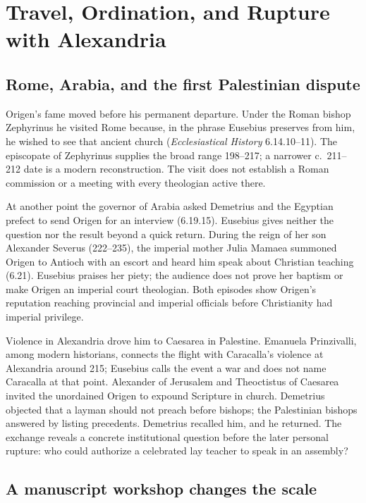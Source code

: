 \section{Travel, Ordination, and Rupture with Alexandria}
\label{sec:origen-rupture}

\subsection{Rome, Arabia, and the first Palestinian dispute}

Origen's fame moved before his permanent departure. Under the Roman bishop
Zephyrinus he visited Rome because, in the phrase Eusebius preserves from him,
he wished to see that ancient church (\emph{Ecclesiastical History} 6.14.10--11).
The episcopate of Zephyrinus supplies the broad range 198--217; a narrower
c.~211--212 date is a modern reconstruction. The visit does not establish a Roman
commission or a meeting with every theologian active there.

At another point the governor of Arabia asked Demetrius and the Egyptian
prefect to send Origen for an interview (6.19.15). Eusebius gives neither the
question nor the result beyond a quick return. During the reign of her son
Alexander Severus (222--235), the imperial mother Julia Mamaea summoned Origen
to Antioch with an escort and heard him speak about
Christian teaching (6.21). Eusebius praises her piety; the audience does not
prove her baptism or make Origen an imperial court theologian. Both episodes
show Origen's reputation reaching provincial and imperial officials before
Christianity had imperial privilege.

Violence in Alexandria drove him to Caesarea in Palestine. Emanuela
Prinzivalli, among modern historians, connects the flight with Caracalla's
violence at Alexandria around 215; Eusebius calls the event a war and does not
name Caracalla at that point. Alexander of Jerusalem and
Theoctistus of Caesarea invited the unordained Origen to expound Scripture in
church. Demetrius objected that a layman should not preach before bishops; the
Palestinian bishops answered by listing precedents. Demetrius recalled him,
and he returned. The exchange reveals a concrete institutional question before
the later personal rupture: who could authorize a celebrated lay teacher to
speak in an assembly?

\subsection{A manuscript workshop changes the scale}

